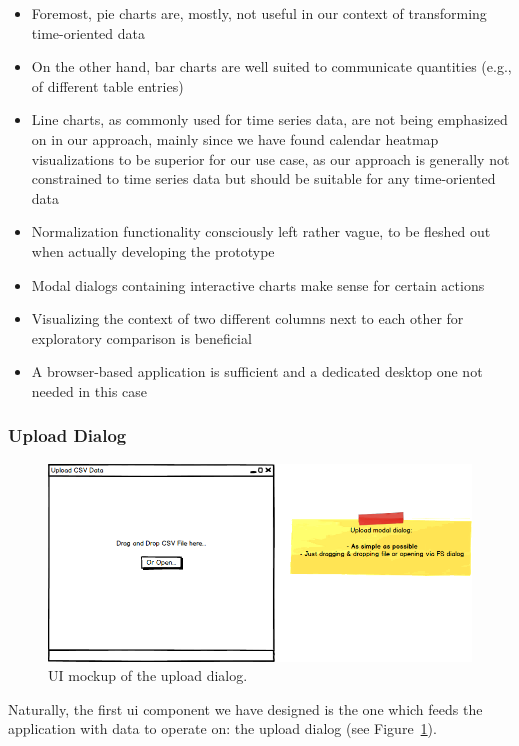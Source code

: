 \begin{itemize}
  \item Foremost, pie charts are, mostly, not useful in our context of transforming time-oriented data
  \item On the other hand, bar charts are well suited to communicate quantities (e.g., of different table entries)
  \item Line charts, as commonly used for time series data, are not being emphasized on in our approach, mainly since we have found calendar heatmap visualizations to be superior for our use case, as our approach is generally not constrained to time series data but should be suitable for any time-oriented data
  \item Normalization functionality consciously left rather vague, to be fleshed out when actually developing the prototype
  \item Modal dialogs containing interactive charts make sense for certain actions
  \item Visualizing the context of two different columns next to each other for exploratory comparison is beneficial
  \item A browser-based application is sufficient and a dedicated desktop one not needed in this case
\end{itemize}


\subsubsection{Upload Dialog}

\begin{figure}[h]
  \centering
  \includegraphics[width=1.125\textwidth]{figures/design/mockup-0}
  \caption{UI mockup of the upload dialog.}
  \label{fig:mockup-0}
\end{figure}

Naturally, the first \gls{ui} component we have designed is the one which feeds the application with data to operate on:
the upload dialog (see Figure~\ref{fig:mockup-0}).

